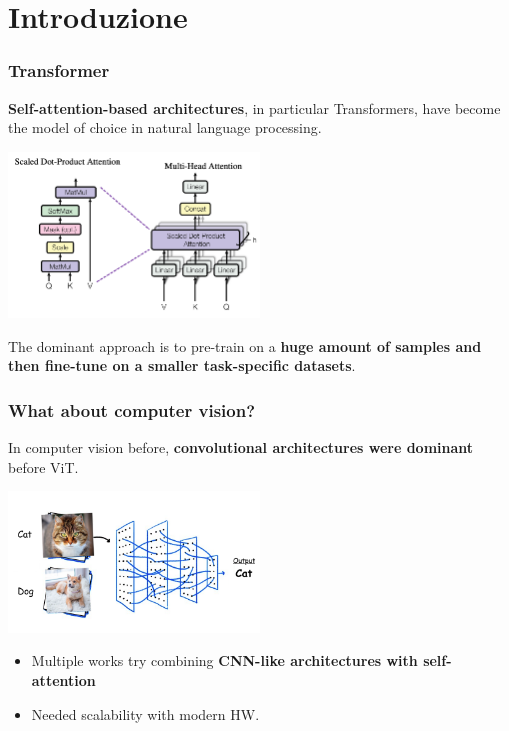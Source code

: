 
\section{Introduzione} %


\begin{frame}
\frametitle{Transformer}
\textbf{Self-attention-based architectures}, in particular Transformers, have become the model of choice in natural language processing.
\vspace{0.5cm}

\includegraphics[width=0.5\textwidth]{img/1-section/Attention.png} 

The dominant approach is to pre-train on a \textbf{huge amount of samples and then fine-tune on a smaller task-specific datasets}.

\end{frame}

\begin{frame}
\frametitle{What about computer vision?}
In computer vision before, \textbf{convolutional architectures were dominant} before ViT.

\includegraphics[width=0.5\textwidth]{img/1-section/classification.png} 

\begin{itemize}
    \item Multiple works try combining \textbf{CNN-like architectures with self-attention}
    \item Needed scalability with modern HW.
\end{itemize}

\end{frame}

